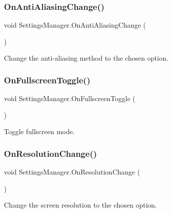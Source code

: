 \subsubsection{\texorpdfstring{On\+Anti\+Aliasing\+Change()}{OnAntiAliasingChange()}}
{\footnotesize\ttfamily void Settings\+Manager.\+On\+Anti\+Aliasing\+Change (\begin{DoxyParamCaption}{ }\end{DoxyParamCaption})}



Change the anti-\/aliasing method to the chosen option. 

\mbox{\label{class_settings_manager_ac690ec7be2f8760959c819ff5235fa60}} 
\subsubsection{\texorpdfstring{On\+Fullscreen\+Toggle()}{OnFullscreenToggle()}}
{\footnotesize\ttfamily void Settings\+Manager.\+On\+Fullscreen\+Toggle (\begin{DoxyParamCaption}{ }\end{DoxyParamCaption})}



Toggle fullscreen mode. 

\mbox{\label{class_settings_manager_a4b9cc3fc84f2c5b2a5f79010a71ddf44}} 
\subsubsection{\texorpdfstring{On\+Resolution\+Change()}{OnResolutionChange()}}
{\footnotesize\ttfamily void Settings\+Manager.\+On\+Resolution\+Change (\begin{DoxyParamCaption}{ }\end{DoxyParamCaption})}



Change the screen resolution to the chosen option. 

\mbox{\label{class_settings_manager_ac64e635b27333995bccd8cdd01e66471}} 

